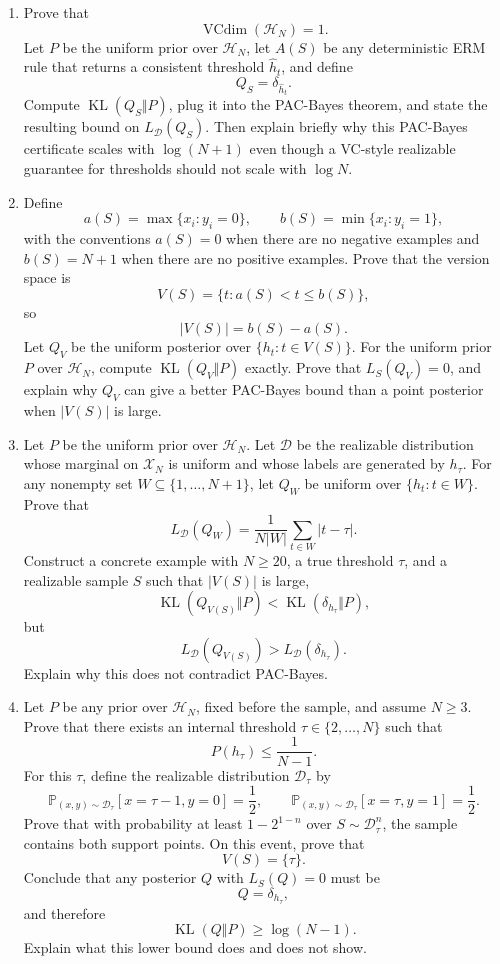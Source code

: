 \documentclass{article}
\begin{document}
\begin{enumerate}
\item Prove that
$$
\operatorname{VCdim}(\mathcal{H}_N)=1.
$$
Let $P$ be the uniform prior over $\mathcal{H}_N$, let $A(S)$ be any deterministic ERM rule that returns a consistent threshold $\widehat{h}_t$, and define
$$
Q_S = \delta_{\widehat{h}_t}.
$$
Compute $\operatorname{KL}(Q_S\Vert P)$, plug it into the PAC-Bayes theorem, and state the resulting bound on $L_{\mathcal{D}}(Q_S)$. Then explain briefly why this PAC-Bayes certificate scales with $\log(N+1)$ even though a VC-style realizable guarantee for thresholds should not scale with $\log N$.

\item Define
$$
a(S)=\max\{x_i : y_i=0\},
\qquad
b(S)=\min\{x_i : y_i=1\},
$$
with the conventions $a(S)=0$ when there are no negative examples and $b(S)=N+1$ when there are no positive examples. Prove that the version space is
$$
V(S)=\{t : a(S) < t \le b(S)\},
$$
so
$$
|V(S)|=b(S)-a(S).
$$
Let $Q_V$ be the uniform posterior over $\{h_t : t\in V(S)\}$. For the uniform prior $P$ over $\mathcal{H}_N$, compute $\operatorname{KL}(Q_V\Vert P)$ exactly. Prove that $L_S(Q_V)=0$, and explain why $Q_V$ can give a better PAC-Bayes bound than a point posterior when $|V(S)|$ is large.

\item Let $P$ be the uniform prior over $\mathcal{H}_N$. Let $\mathcal{D}$ be the realizable distribution whose marginal on $\mathcal{X}_N$ is uniform and whose labels are generated by $h_\tau$. For any nonempty set $W \subseteq \{1,\dots,N+1\}$, let $Q_W$ be uniform over $\{h_t : t\in W\}$. Prove that
$$
L_{\mathcal{D}}(Q_W)
=
\frac{1}{N|W|}
\sum_{t\in W}|t-\tau|.
$$
Construct a concrete example with $N\ge 20$, a true threshold $\tau$, and a realizable sample $S$ such that $|V(S)|$ is large,
$$
\operatorname{KL}(Q_{V(S)}\Vert P) < \operatorname{KL}(\delta_{h_\tau}\Vert P),
$$
but
$$
L_{\mathcal{D}}(Q_{V(S)}) > L_{\mathcal{D}}(\delta_{h_\tau}).
$$
Explain why this does not contradict PAC-Bayes.

\item Let $P$ be any prior over $\mathcal{H}_N$, fixed before the sample, and assume $N\ge 3$. Prove that there exists an internal threshold $\tau \in \{2,\dots,N\}$ such that
$$
P(h_\tau) \le \frac{1}{N-1}.
$$
For this $\tau$, define the realizable distribution $\mathcal{D}_\tau$ by
$$
\mathbb{P}_{(x,y)\sim\mathcal{D}_\tau}[x=\tau-1,y=0]=\frac12,
\qquad
\mathbb{P}_{(x,y)\sim\mathcal{D}_\tau}[x=\tau,y=1]=\frac12.
$$
Prove that with probability at least $1-2^{1-n}$ over $S\sim\mathcal{D}_\tau^n$, the sample contains both support points. On this event, prove that
$$
V(S)=\{\tau\}.
$$
Conclude that any posterior $Q$ with $L_S(Q)=0$ must be
$$
Q=\delta_{h_\tau},
$$
and therefore
$$
\operatorname{KL}(Q\Vert P)\ge \log(N-1).
$$
Explain what this lower bound does and does not show.
\end{enumerate}
\end{document}
